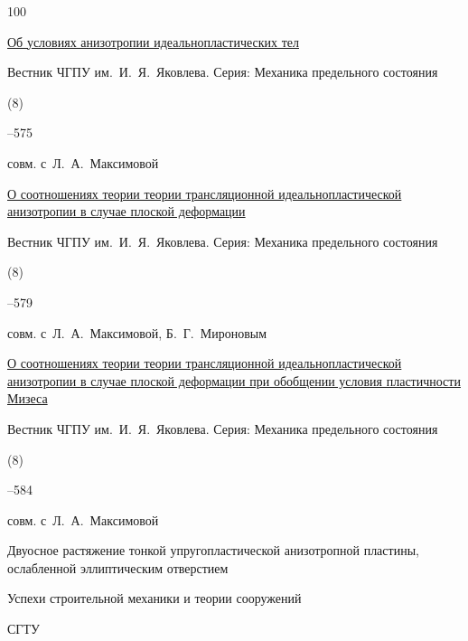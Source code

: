 \begin{thebibliography}{100}

\paper \href{http://elibrary.ru/item.asp?id=16535008}{Об условиях анизотропии идеальнопластических тел}

\jour Вестник ЧГПУ им.~И.~Я.~Яковлева. Серия: Механика предельного состояния


(8)

–575 

\miscnote совм. с~Л.~А.~Максимовой





\paper \href{http://elibrary.ru/item.asp?id=16535010}{О соотношениях теории теории трансляционной идеальнопластической анизотропии в случае плоской деформации}

\jour Вестник ЧГПУ им.~И.~Я.~Яковлева. Серия: Механика предельного состояния


(8)

–579 

\miscnote совм. с~Л.~А.~Максимовой, Б.~Г.~Мироновым







\paper \href{http://elibrary.ru/item.asp?id=16535011}{О соотношениях теории теории трансляционной идеальнопластической анизотропии в случае плоской деформации при обобщении условия пластичности Мизеса} 

\jour Вестник ЧГПУ им.~И.~Я.~Яковлева. Серия: Механика предельного состояния


(8)

–584 

\miscnote совм. с~Л.~А.~Максимовой





\paper Двуосное растяжение тонкой упругопластической анизотропной пластины, ослабленной эллиптическим отверстием 

\inbook Успехи строительной механики и теории сооружений

\publ СГТУ


\end{thebibliography}
